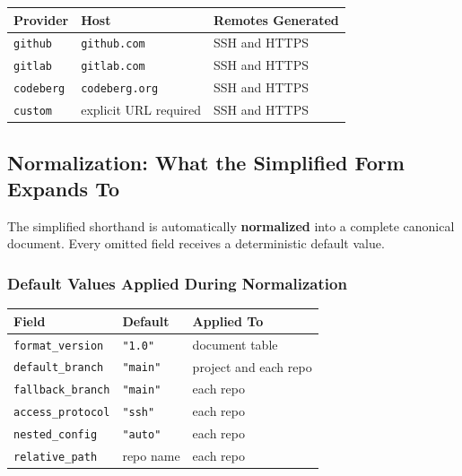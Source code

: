 \begin{center}
\begin{tabular}{lll}
\textbf{Provider} & \textbf{Host} & \textbf{Remotes Generated} \\ \hline
\texttt{github}   & \texttt{github.com}   & SSH and HTTPS \\
\texttt{gitlab}   & \texttt{gitlab.com}   & SSH and HTTPS \\
\texttt{codeberg} & \texttt{codeberg.org} & SSH and HTTPS \\
\texttt{custom}   & explicit URL required & SSH and HTTPS \\
\end{tabular}
\end{center}

\subsection{Normalization: What the Simplified Form Expands To}
\label{subsec:cgs-normalization}

The simplified shorthand is automatically \textbf{normalized} into a complete
canonical document. Every omitted field receives a deterministic default value.

\subsubsection{Default Values Applied During Normalization}

\begin{center}
\begin{tabular}{lll}
\textbf{Field} & \textbf{Default} & \textbf{Applied To} \\ \hline
\texttt{format\_version} & \texttt{"1.0"} & document table \\
\texttt{default\_branch} & \texttt{"main"} & project and each repo \\
\texttt{fallback\_branch} & \texttt{"main"} & each repo \\
\texttt{access\_protocol} & \texttt{"ssh"} & each repo \\
\texttt{nested\_config} & \texttt{"auto"} & each repo \\
\texttt{relative\_path} & repo name & each repo \\
\end{tabular}
\end{center}

